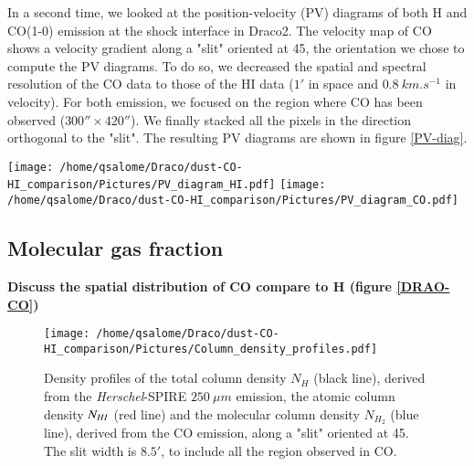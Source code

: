 \documentclass[traditabstract]{aa}
\begin{document}
   In a second time, we looked at the position-velocity (PV) diagrams of both H and CO(1-0) emission at the shock interface in Draco2. The velocity map of CO shows a velocity gradient along a "slit" oriented at 45\degree, the orientation we chose to compute the PV diagrams. To do so, we decreased the spatial and spectral resolution of the CO data to those of the HI data ($1'$ in space and $0.8\: km.s^{-1}$ in velocity). For both emission, we focused on the region where CO has been observed ($300''\times 420''$). We finally stacked all the pixels in the direction orthogonal to the "slit". The resulting PV diagrams are shown in figure \ref{PV-diag}.

\begin{figure*}[h!]
  \centering
  \texttt{[image: /home/qsalome/Draco/dust-CO-HI\_comparison/Pictures/PV\_diagram\_HI.pdf]}
  \hspace{3mm}
  \texttt{[image: /home/qsalome/Draco/dust-CO-HI\_comparison/Pictures/PV\_diagram\_CO.pdf]}
  \caption{\label{PV-diag} Position-velocity diagrams of the H (\emph{left}) and CO (\emph{right}) in Draco2. The PV diagrams are centred in $\alpha=16^h 51^m 13.3^s$, $\delta=+$60:55:23.7 over a slit oriented at 45\degree with a width of $8.5'$, to include all the region observed in CO. They were computed at $1'$ and $0.8\: km.s^{-1}$ resolution.}
\end{figure*}


   \subsection{Molecular gas fraction}

\textbf{Discuss the spatial distribution of CO compare to H (figure \ref{DRAO-CO})}

\begin{figure}[h!]
  \centering
  \texttt{[image: /home/qsalome/Draco/dust-CO-HI\_comparison/Pictures/Column\_density\_profiles.pdf]}
  \caption{\label{Col_density} Density profiles of the total column density $N_H$ (black line), derived from the \emph{Herschel}-SPIRE $250\: \mu m$ emission, the atomic column density $N_{H\rmnum{1}}$ (red line) and the molecular column density $N_{H_2}$ (blue line), derived from the CO emission, along a "slit" oriented at 45\degree. The slit width is $8.5'$, to include all the region observed in CO.}
\end{figure}
\end{document}
